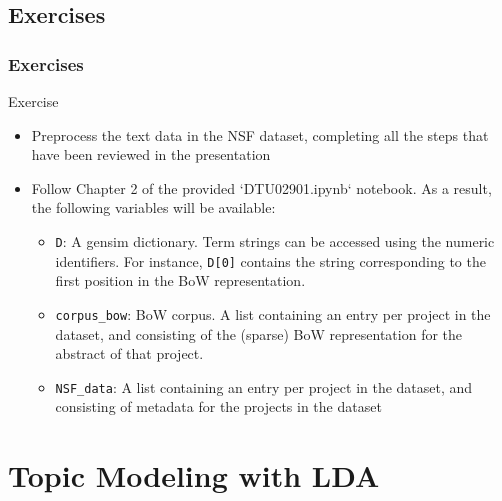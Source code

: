 \documentclass{beamer}
\begin{document}
\subsection{Exercises}

\begin{frame}

    \frametitle{Exercises}

    \begin{exampleblock}{Exercise}
	
	\begin{itemize}
		\item Preprocess the text data in the NSF dataset, completing all the steps that have been reviewed in the presentation
		\item Follow Chapter 2 of the provided `DTU02901.ipynb` notebook. As a result, the following variables will be available:
		
		\begin{itemize}
			\item {\tt D}: A gensim dictionary. Term strings can be accessed using the numeric identifiers. For instance, {\tt D[0]} contains the string corresponding to the first position in the BoW representation.
			\item {\tt corpus\_bow}: BoW corpus. A list containing an entry per project in the dataset, and consisting of the (sparse) BoW representation for the abstract of that project.
			\item {\tt NSF\_data}: A list containing an entry per project in the dataset, and consisting of metadata for the projects in the dataset
		\end{itemize}
		
	\end{itemize}
	\end{exampleblock}
				    
\end{frame}


\section{Topic Modeling with LDA}
\end{document}
